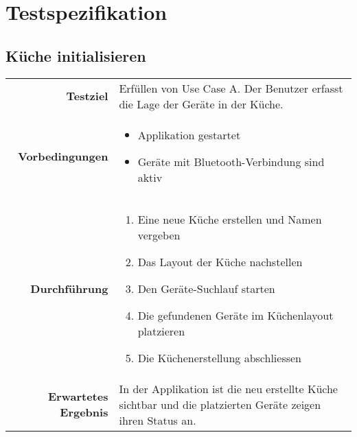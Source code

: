 \section{Testspezifikation}
\label{sec:Testspezifikation}

\subsection{Küche initialisieren}
\begin{table}[H]
\begin{tabularx}{\textwidth}{r X }
\textbf{Testziel} & Erfüllen von Use Case A. Der Benutzer erfasst die Lage der Geräte in der Küche. \\
\textbf{Vorbedingungen} & \begin{itemize}
\item Applikation gestartet
\item Geräte mit Bluetooth-Verbindung sind aktiv
\end{itemize} \\
\textbf{Durchführung} & \begin{enumerate}
\item Eine neue Küche erstellen und Namen vergeben
\item Das Layout der Küche nachstellen
\item Den Geräte-Suchlauf starten
\item Die gefundenen Geräte im Küchenlayout platzieren
\item Die Küchenerstellung abschliessen
\end{enumerate} \\
\textbf{Erwartetes Ergebnis} & In der Applikation ist die neu erstellte Küche sichtbar und die platzierten Geräte zeigen ihren Status an.\\
\end{tabularx}
\end{table}

